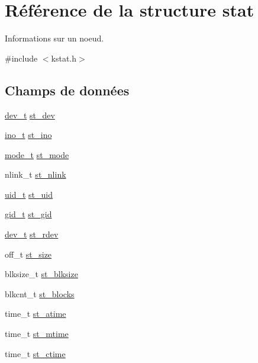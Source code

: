 \hypertarget{structstat}{\section{Référence de la structure stat}
\label{structstat}
}


Informations sur un noeud.  




{\ttfamily \#include $<$kstat.\-h$>$}

\subsection*{Champs de données}
\begin{DoxyCompactItemize}
\item 
\hyperlink{kstat_8h_a451f1b5788fa7cc5d33db47a5992e7a6}{dev\-\_\-t} \hyperlink{structstat_ac5b90090ae323741ae4c9e4f3683a29f}{st\-\_\-dev}
\item 
\hyperlink{kstat_8h_aed4e918b44240739869c4bdb1c4787a9}{ino\-\_\-t} \hyperlink{structstat_a9769ed8f0d4c5a9f329c32bc92479d56}{st\-\_\-ino}
\item 
\hyperlink{kstat_8h_af8f4385bb42836d1e3ad4fea9d71d1b9}{mode\-\_\-t} \hyperlink{structstat_a5cbdd829011af82ba61e83773bbcbc7d}{st\-\_\-mode}
\item 
nlink\-\_\-t \hyperlink{structstat_a0ed9092fa6c77a3251b9b9a4738ef84f}{st\-\_\-nlink}
\item 
\hyperlink{kstat_8h_af2306308627701b66dc6f3babe821ab4}{uid\-\_\-t} \hyperlink{structstat_a4a8708a3d18be60ee7b2f06c4cab0c70}{st\-\_\-uid}
\item 
\hyperlink{kstat_8h_aa7352f1065fe606194d792e2b292cf83}{gid\-\_\-t} \hyperlink{structstat_ab864f16f436cec370f0ced585d897698}{st\-\_\-gid}
\item 
\hyperlink{kstat_8h_a451f1b5788fa7cc5d33db47a5992e7a6}{dev\-\_\-t} \hyperlink{structstat_aa61e6c1a8a91c69f1d26f6700a0546cb}{st\-\_\-rdev}
\item 
off\-\_\-t \hyperlink{structstat_a040e19c8b9766f841fde8786ce9297bf}{st\-\_\-size}
\item 
blksize\-\_\-t \hyperlink{structstat_a38d474e1ae3cf6fbdde89ac3c3e308f1}{st\-\_\-blksize}
\item 
blkcnt\-\_\-t \hyperlink{structstat_a42dd716b2f9234f961d949fc9500eefb}{st\-\_\-blocks}
\item 
time\-\_\-t \hyperlink{structstat_ab74d1e7e345e88b9d0fb2688a97cba64}{st\-\_\-atime}
\item 
time\-\_\-t \hyperlink{structstat_a77e235090f8cb6897f1c0ce65689006b}{st\-\_\-mtime}
\item 
time\-\_\-t \hyperlink{structstat_a1b4b858db1ebe79c3d6e0fc1ef721024}{st\-\_\-ctime}
\end{DoxyCompactItemize}


